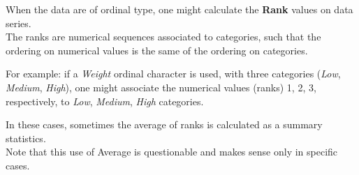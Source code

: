 \begin{frame}
  \vspace{.35cm}
  When the data are of ordinal type, one might calculate the \textbf{Rank} values on data series.\\
  \vspace{.35cm}
  The ranks are numerical sequences associated to categories, such that the ordering on numerical values is the same of the ordering on categories. \\
  \vspace{.2cm}
  \begin{small}
    For example: if a \textit{Weight} ordinal character is used, with three categories (\textit{Low}, \textit{Medium}, \textit{High}), one might associate the numerical values (ranks) 1, 2, 3, respectively, to \textit{Low}, \textit{Medium}, \textit{High} categories.\\
  \end{small}
  \vspace{.35cm}
  In these cases, sometimes the average of ranks is calculated as a summary statistics.\\
  \vspace{.35cm}
  Note that this use of Average is questionable and makes sense only in specific cases.
\end{frame}



